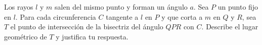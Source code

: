 Los rayos $l$ y $m$ salen del mismo punto y forman un ángulo $a$. Sea $P$ un punto fijo en $l$. Para cada circunferencia $C$ tangente a $l$ en $P$ y que corta a $m$ en $Q$ y $R$, sea $T$ el punto de intersección de la bisectriz del ángulo $QPR$ con $C$. Describe el lugar geométrico de $T$ y justifica tu respuesta. 